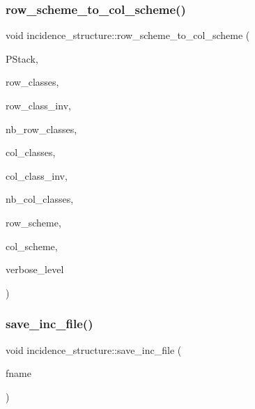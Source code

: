 \subsubsection{\texorpdfstring{row\+\_\+scheme\+\_\+to\+\_\+col\+\_\+scheme()}{row\_scheme\_to\_col\_scheme()}}
{\footnotesize\ttfamily void incidence\+\_\+structure\+::row\+\_\+scheme\+\_\+to\+\_\+col\+\_\+scheme (\begin{DoxyParamCaption}\item[{\mbox{\hyperlink{classpartitionstack}{partitionstack}} \&}]{P\+Stack,  }\item[{\mbox{\hyperlink{galois_8h_a09fddde158a3a20bd2dcadb609de11dc}{I\+NT}} $\ast$}]{row\+\_\+classes,  }\item[{\mbox{\hyperlink{galois_8h_a09fddde158a3a20bd2dcadb609de11dc}{I\+NT}} $\ast$}]{row\+\_\+class\+\_\+inv,  }\item[{\mbox{\hyperlink{galois_8h_a09fddde158a3a20bd2dcadb609de11dc}{I\+NT}}}]{nb\+\_\+row\+\_\+classes,  }\item[{\mbox{\hyperlink{galois_8h_a09fddde158a3a20bd2dcadb609de11dc}{I\+NT}} $\ast$}]{col\+\_\+classes,  }\item[{\mbox{\hyperlink{galois_8h_a09fddde158a3a20bd2dcadb609de11dc}{I\+NT}} $\ast$}]{col\+\_\+class\+\_\+inv,  }\item[{\mbox{\hyperlink{galois_8h_a09fddde158a3a20bd2dcadb609de11dc}{I\+NT}}}]{nb\+\_\+col\+\_\+classes,  }\item[{\mbox{\hyperlink{galois_8h_a09fddde158a3a20bd2dcadb609de11dc}{I\+NT}} $\ast$}]{row\+\_\+scheme,  }\item[{\mbox{\hyperlink{galois_8h_a09fddde158a3a20bd2dcadb609de11dc}{I\+NT}} $\ast$}]{col\+\_\+scheme,  }\item[{\mbox{\hyperlink{galois_8h_a09fddde158a3a20bd2dcadb609de11dc}{I\+NT}}}]{verbose\+\_\+level }\end{DoxyParamCaption})}

\mbox{\label{classincidence__structure_a4fd15671d6a99a4cae34a24e3c0b7705}} 
\subsubsection{\texorpdfstring{save\+\_\+inc\+\_\+file()}{save\_inc\_file()}}
{\footnotesize\ttfamily void incidence\+\_\+structure\+::save\+\_\+inc\+\_\+file (\begin{DoxyParamCaption}\item[{\mbox{\hyperlink{galois_8h_ab6cc7b4aeb6ea31aba2b3fbfc83ff5e6}{B\+Y\+TE}} $\ast$}]{fname }\end{DoxyParamCaption})}


